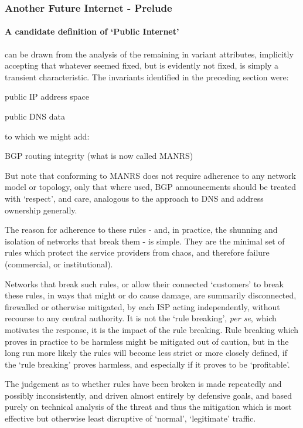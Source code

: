 \subsubsection{Another Future Internet - Prelude}

\paragraph{A candidate definition of `Public Internet'} can be drawn from the analysis of the remaining in variant attributes, implicitly accepting that whatever seemed fixed, but is evidently not fixed, is simply a transient characteristic.  The invariants identified in the preceding section were:
\begin{myitemize}
  \item public IP address space
  \item public DNS data
 \end{myitemize}
 to which we might add:
   \begin{myitemize}
  \item BGP routing integrity (what is now called MANRS\cite{Davidson2018})
 \end{myitemize}
 But note that conforming to MANRS does not require adherence to any network model or topology, only that where used, BGP announcements should be treated with `respect', and care, analogous to the approach to DNS and address ownership generally.

 The reason for adherence to these rules - and, in practice, the shunning and isolation of networks that break them - is simple.  They are the minimal set of rules which protect the service providers from chaos, and therefore failure (commercial, or institutional).
 
 Networks that break such rules, or allow  their connected `customers' to break these rules, in ways that might or do cause damage, are summarily disconnected, firewalled or otherwise mitigated, by each ISP acting independently, without recourse to any central authority.  It is not the `rule breaking', \textit{per se}, which motivates the response, it is the impact of the rule breaking.  Rule breaking which proves in practice to be harmless might be mitigated out of caution, but in the long run more likely the rules will become less strict or more closely defined, if the `rule breaking' proves harmless, and especially if it proves to be `profitable'.

 The judgement as to whether rules have been broken is made repeatedly and possibly inconsistently, and driven almost entirely by defensive goals, and based purely on technical analysis of the threat and thus the mitigation which is most effective but otherwise least disruptive of `normal', `legitimate' traffic.

